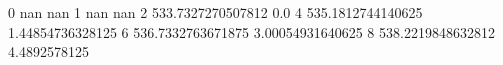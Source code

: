 0 nan nan
1 nan nan
2 533.7327270507812 0.0
4 535.1812744140625 1.44854736328125
6 536.7332763671875 3.00054931640625
8 538.2219848632812 4.4892578125
